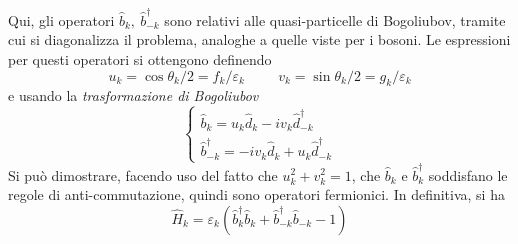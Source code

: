 \documentclass[11pt, a4paper]{scrartcl}
\theoremstyle{style}
\theoremstyle{style1}
\numberwithin{equation}{subsection}
\begin{document}
Qui, gli operatori $\hat{b}_k, \ \hat{b}^\dagger _{-k} $ sono relativi alle quasi-particelle di Bogoliubov, tramite cui si diagonalizza il problema, analoghe a quelle viste per i bosoni.
Le espressioni per questi operatori si ottengono definendo 
\[
u_k = \cos \theta _k / 2 = f_k / \varepsilon _k \hspace{1cm} v_ k = \sin \theta _k / 2  = g_ k / \varepsilon _k
\] 
e usando la \textit{trasformazione di Bogoliubov} 
\[
\begin{cases}
	\hat{b}_k = u _k \hat{d}_k - i v_k \hat{d}^\dagger _{-k} \\
	\hat{b}^\dagger _{-k}  = - i v _k \hat{d}_k + u _k \hat{d}^\dagger _{-k} 
\end{cases}
\] 
Si pu\`o dimostrare, facendo uso del fatto che $u_k^2 + v_k ^2 = 1$, che $\hat{b}_k$ e $\hat{b}^\dagger _k$ soddisfano le regole di anti-commutazione, quindi sono operatori fermionici.
In definitiva, si ha
\[
\hat{H} _k = \varepsilon _k \left(\hat{b}_k^\dagger \hat{b}_k + \hat{b}^\dagger _{-k} \hat{b}_{-k} -1\right) 
\] 
\end{document}
